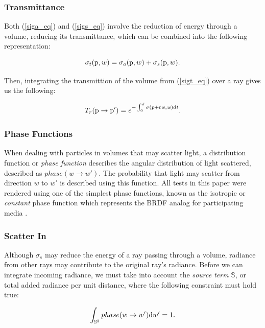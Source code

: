 \documentclass[runningheads]{llncs}
\begin{document}
\subsubsection{Transmittance}
Both (\ref{siga_eq}) and (\ref{sigs_eq}) involve the reduction of energy through a volume, reducing its transmittance, which can be combined into the following representation:

\begin{equation}
\sigma_{t}(\textup{p},w) = \sigma_{a}(\textup{p},w) + \sigma_{s}(\textup{p}, w).
\label{sigt_eq}
\end{equation}

Then, integrating the transmittion of the volume from (\ref{sigt_eq}) over a ray gives us the following:

\begin{equation}
T_{r}(\textup{p} \to \textup{p}') = e^{-\int_{0}^{d}\sigma (p+t\mathit{w},\mathit{w})d\mathit{t}}.
\label{transmittion_eq}
\end{equation}

\subsubsection{Phase Functions}
When dealing with particles in volumes that may scatter light, a distribution function or \textit{phase function} describes the angular distribution of light scattered, described as $phase(w \to w')$.  The probability that light may scatter from direction $w$ to $w'$ is described using this function.  All tests in this paper were rendered using one of the simplest phase functions, known as the isotropic or \textit{constant} phase function which represents the BRDF analog for participating media \cite{cerezo}.

\subsubsection{Scatter In}
Although $\sigma_{s}$ may reduce the energy of a ray passing through a volume, radiance from other rays may contribute to the original ray's radiance.  Before we can integrate incoming radiance, we must take into account the \textit{source term} $\mathbb{S}$, or total added radiance per unit distance, where the following constraint must hold true:

\begin{equation}
\int_{\mathbb{S}^2}phase(w \to w')\textup{d}w' = 1.
\label{source_eq}
\end{equation}
\end{document}
